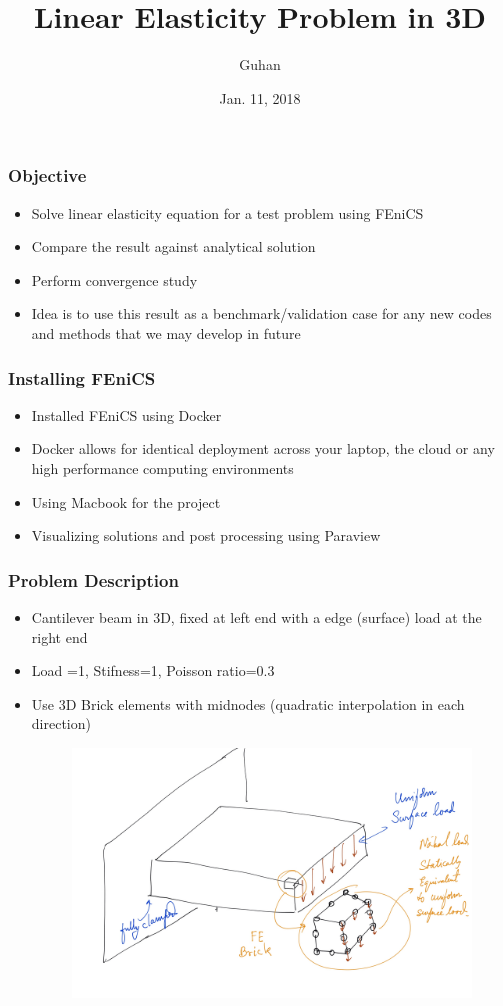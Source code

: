 \documentclass{beamer}
\title{Linear Elasticity Problem in 3D }
\author{Guhan}
\date{Jan. 11, 2018}
\begin{document}
 
\frame{\titlepage}
 
\begin{frame}
\frametitle{Objective}
\begin{itemize}
		\vfill
		\item{Solve linear elasticity equation for a test problem using FEniCS}
		\vfill
		\item{Compare the result against analytical solution}
		\vfill
		\item{Perform convergence study}
		\vfill
		\item{Idea is to use this result as a benchmark/validation case for any new codes and methods that we may develop in future}
		\vfill
\end{itemize}
\end{frame}
 
 \begin{frame}
\frametitle{Installing FEniCS}
\begin{itemize}
		\vfill
		\item{Installed FEniCS using Docker}
		\vfill
		\item{Docker allows for identical deployment across your laptop, the cloud or  any high performance computing environments}
		\vfill
		\item{Using Macbook for the project}
		\vfill
		\item{Visualizing solutions and post processing using Paraview}
		\vfill
\end{itemize}
\end{frame}


 \begin{frame}
\frametitle{Problem Description}
\begin{itemize}
		\vfill
		\item{Cantilever beam in 3D, fixed at left end with a edge (surface) load at the right end}
		\vfill
		\item{Load =1, Stifness=1, Poisson ratio=0.3}
		\vfill
		\item{Use 3D Brick elements with midnodes (quadratic interpolation in each direction)}
		\vfill
\begin{figure}
\includegraphics[width=.9\textwidth]{fea_0}
\end{figure}
\end{itemize}
\end{frame}
\end{document}
